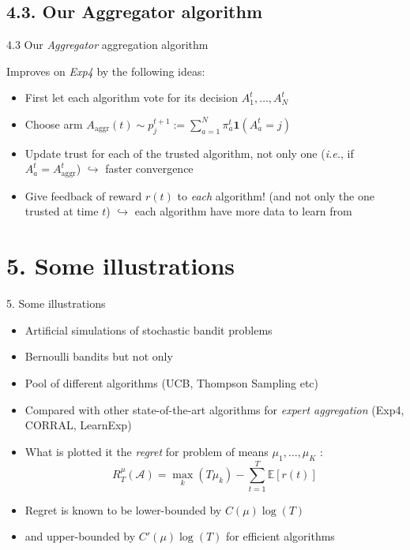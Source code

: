 \documentclass[12pt,english,ignorenonframetext,]{beamer}
\providecommand{\tightlist}{%
  \setlength{\itemsep}{0pt}\setlength{\parskip}{0pt}}
\begin{document}
\subsection{\hfill{}4.3. Our Aggregator algorithm\hfill{}}

\begin{frame}{4.3 Our \emph{Aggregator} aggregation algorithm}

Improves on \emph{Exp4} by the following ideas:

\begin{itemize}
\item
  First let each algorithm vote for its decision \(A_1^t,\ldots,A_N^t\)
\item
  Choose arm
  \(A_{\text{aggr}}(t) \sim p_j^{t+1} := \sum\limits_{a=1}^N \pi_a^t \mathbf{1}(A_a^t = j)\)
\item
  Update trust for each of the trusted algorithm, not only one
  (\emph{i.e.}, if \(A_a^t = A_{\text{aggr}}^t\)) \(\hookrightarrow\)
  faster convergence
\item
  Give feedback of reward \(r(t)\) to \emph{each} algorithm! (and not
  only the one trusted at time \(t\)) \(\hookrightarrow\) each algorithm
  have more data to learn from
\end{itemize}

\end{frame}



\section{\hfill{}5. Some illustrations\hfill{}}

\begin{frame}{%
\protect\hypertarget{some-illustrations}{%
5. Some illustrations}}

\begin{itemize}
\tightlist
\item
  Artificial simulations of stochastic bandit problems
\item
  Bernoulli bandits but not only
\item
  Pool of different algorithms (UCB, Thompson Sampling etc)
\item
  Compared with other state-of-the-art algorithms for \emph{expert
  aggregation} (Exp4, CORRAL, LearnExp)
\item
  What is plotted it the \emph{regret} for problem of means
  \(\mu_1,\ldots,\mu_K\) :
  \[ R_T^{\mu}(\mathcal{A}) = \max_k (T \mu_k) - \sum_{t=1}^T \mathbb{E}[r(t)] \]
\item
  Regret is known to be lower-bounded by \(C(\mu) \log(T)\)
\item
  and upper-bounded by \(C'(\mu) \log(T)\) for efficient algorithms
\end{itemize}

\end{frame}
\end{document}
